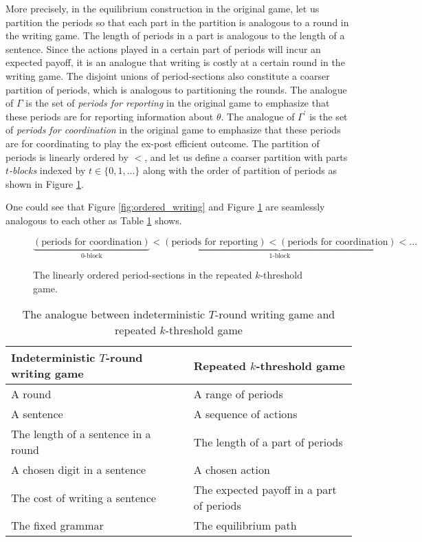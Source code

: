 \documentclass[12pt,letter]{article}
\theoremstyle{definition}
\theoremstyle{remark}
\theoremstyle{claim}
\begin{document}
More precisely, in the equilibrium construction in the original game, let us partition the periods so that each part in the partition is analogous to a round in the writing game. The length of periods in a part is analogous to the length of a sentence. Since the actions played in a certain part of periods will incur an expected payoff, it is an analogue that writing is costly at a certain round in the writing game. The disjoint unions of period-sections also constitute a coarser partition of periods, which is analogous to partitioning the rounds. The analogue of $\Gamma$ is the set of \textit{periods for reporting} in the original game to emphasize that these periods are for reporting information about $\theta$. The analogue of $\Gamma^{'}$ is the set of \textit{periods for coordination} in the original game to emphasize that these periods are for coordinating to play the ex-post efficient outcome. The partition of periods is linearly ordered by $<$, and let us define a coarser partition with parts \textit{$t$-blocks} indexed by $t\in\{0,1,...\}$ along with the order of partition of periods as shown in Figure \ref{fig:ordered_original_game}. 

One could see that Figure \ref{fig:ordered_writing} and Figure \ref{fig:ordered_original_game} are seamlessly analogous to each other as Table \ref{table:analogue} shows.

\begin{figure}

\label{fig:ordered_original_game}
\[\underbrace{(\text{periods for coordination})}_{\text{$0$-block}}<\underbrace{(\text{periods for reporting})<(\text{periods for coordination})}_{\text{$1$-block}}<...\]
\caption{The linearly ordered period-sections in the repeated $k$-threshold game.}
\end{figure}


\begin{table}[!htbp]
\caption{The analogue between indeterministic $T$-round writing game and repeated $k$-threshold game}
\label{table:analogue}
\begin{center}
\begin{tabular}{ll }
Indeterministic $T$-round writing game & Repeated $k$-threshold game \\
\hline
\hline
A round & A range of periods\\
A sentence & A sequence of actions \\
The length of a sentence in a round & The length of a part of periods\\
A chosen digit in a sentence & A chosen action\\
The cost of writing a sentence & The expected payoff in a part of periods\\
The fixed grammar & The equilibrium path\\
\hline
\end{tabular}
\end{center}

\end{table}
\end{document}

